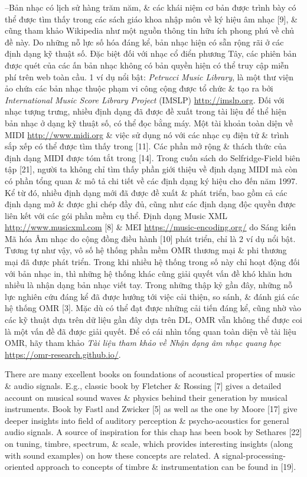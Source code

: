 \documentclass{article}
\begin{document}
\begin{itemize}
\begin{itemize}
		--Bản nhạc có lịch sử hàng trăm năm, \& các khái niệm cơ bản được trình bày có thể được tìm thấy trong các sách giáo khoa nhập môn về ký hiệu âm nhạc [9], \& cũng tham khảo Wikipedia như một nguồn thông tin hữu ích phong phú về chủ đề này. Do những nỗ lực số hóa đáng kể, bản nhạc hiện có sẵn rộng rãi ở các định dạng kỹ thuật số. Đặc biệt đối với nhạc cổ điển phương Tây, các phiên bản được quét của các ấn bản nhạc không có bản quyền hiện có thể truy cập miễn phí trên web toàn cầu. 1 ví dụ nổi bật: {\it Petrucci Music Library}, là một thư viện ảo chứa các bản nhạc thuộc phạm vi công cộng được tổ chức \& tạo ra bởi {\it International Music Score Library Project} (IMSLP) \url{http://imslp.org}. Đối với nhạc tượng trưng, nhiều định dạng đã được đề xuất trong tài liệu để thể hiện bản nhạc ở dạng kỹ thuật số, có thể đọc bằng máy. Một tài khoản toàn diện về MIDI \url{http://www.midi.org} \& việc sử dụng nó với các nhạc cụ điện tử \& trình sắp xếp có thể được tìm thấy trong [11]. Các phần mở rộng \& thách thức của định dạng MIDI được tóm tắt trong [14]. Trong cuốn sách do Selfridge-Field biên tập [21], người ta không chỉ tìm thấy phần giới thiệu về định dạng MIDI mà còn có phần tổng quan \& mô tả chi tiết về các định dạng ký hiệu cho đến năm 1997. Kể từ đó, nhiều định dạng mới đã được đề xuất \& phát triển, bao gồm cả các định dạng mở \& được ghi chép đầy đủ, cũng như các định dạng độc quyền được liên kết với các gói phần mềm cụ thể. Định dạng Music XML \url{http://www.musicxml.com} [8] \& MEI \url{https://music-encoding.org/} do Sáng kiến Mã hóa Âm nhạc do cộng đồng điều hành [10] phát triển, chỉ là 2 ví dụ nổi bật. Tương tự như vậy, vô số hệ thống phần mềm OMR thương mại \& phi thương mại đã được phát triển. Trong khi nhiều hệ thống trong số này chỉ hoạt động đối với bản nhạc in, thì những hệ thống khác cũng giải quyết vấn đề khó khăn hơn nhiều là nhận dạng bản nhạc viết tay. Trong những thập kỷ gần đây, những nỗ lực nghiên cứu đáng kể đã được hướng tới việc cải thiện, so sánh, \& đánh giá các hệ thống OMR [3]. Mặc dù có thể đạt được những cải tiến đáng kể, cũng nhờ vào các kỹ thuật dựa trên dữ liệu gần đây dựa trên DL, OMR vẫn không thể được coi là một vấn đề đã được giải quyết. Để có cái nhìn tổng quan toàn diện về tài liệu OMR, hãy tham khảo {\it Tài liệu tham khảo về Nhận dạng âm nhạc quang học} \url{https://omr-research.github.io/}.
		
		There are many excellent books on foundations of acoustical properties of music \& audio signals. E.g., classic book by Fletcher \& Rossing [7] gives a detailed account on musical sound waves \& physics behind their generation by musical instruments. Book by Fastl and Zwicker [5] as well as the one by Moore [17] give deeper insights into field of auditory perception \& psycho-acoustics for general audio signals. A source of inspiration for this chap has been book by Sethares [22] on tuning, timbre, spectrum, \& scale, which provides interesting insights (along with sound examples) on how these concepts are related. A signal-processing-oriented approach to concepts of timbre \& instrumentation can be found in [19].
		

\end{itemize}
\end{itemize}
\end{document}
